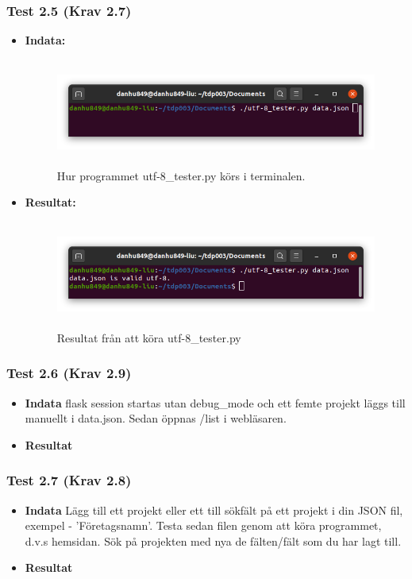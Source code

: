 \documentclass{TDP003mall}
\begin{document}
\subsubsection*{Test 2.5 (Krav 2.7)}
\begin{itemize}
\item[]\textbf{Indata:}
\begin{figure}[h!]
\centerline{\includegraphics[width=\textwidth, height=3.5cm]{../Pictures/utf-8_tester_test.png}}
\caption{Hur programmet utf-8\_tester.py körs i terminalen.\label{fig:}}
\end{figure}
\item[]\textbf{Resultat:}
\begin{figure}[h!]
\centerline{\includegraphics[width=\textwidth, height=3.5cm]{../Pictures/utf-8_tester_valid.png}}
\caption{Resultat från att köra utf-8\_tester.py\label{fig:}}
\end{figure}
\end{itemize}
\subsubsection*{Test 2.6 (Krav 2.9)}
\begin{itemize}
\item[]\textbf{Indata} flask session startas utan debug\_mode och ett femte projekt läggs till manuellt i data.json. Sedan öppnas /list i webläsaren.
\item[]\textbf{Resultat} 
\end{itemize}
\subsubsection*{Test 2.7 (Krav 2.8)}
\begin{itemize}
\item[]\textbf{Indata} Lägg till ett projekt eller ett till sökfält på ett projekt i din JSON fil, exempel - 'Företagsnamn'. Testa sedan filen genom att köra programmet, d.v.s hemsidan. Sök på projekten med nya de fälten/fält som du har lagt till.  
\item[]\textbf{Resultat} 
\end{itemize}
\end{document}
